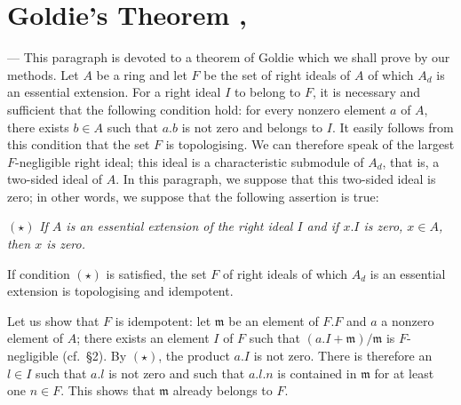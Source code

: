 %
%
%

\section{Goldie's Theorem \textup{\cite{goldie}, \cite{lesieur-croisot-1}}}

--- This paragraph is devoted to a theorem of Goldie which we shall
prove by our methods. Let $A$ be a ring and let $F$ be the set of right
ideals of $A$ of which $A_d$ is an essential extension. For a right
ideal $I$ to belong to $F$, it is necessary and sufficient that the
following condition hold: for every nonzero element $a$ of $A$, there
exists $b\in A$ such that $a.b$ is not zero and belongs to $I$. It
easily follows from this condition that the set $F$ is topologising. We
can therefore speak of the largest $F$-negligible right ideal; this
ideal is a characteristic submodule of $A_d$, that is, a two-sided ideal
of $A$. In this paragraph, we suppose that this two-sided ideal is
zero; in other words, we suppose that the following assertion is true:

$(\star)$ \emph{If $A$ is an essential extension of the right ideal $I$
and if $x.I$ is zero, $x\in A$, then $x$ is zero.}

\begin{lemma}
If condition $(\star)$ is satisfied, the set $F$ of right ideals of
which $A_d$ is an essential extension is topologising and idempotent.
\end{lemma}

Let us show that $F$ is idempotent: let $\mathfrak{m}$ be an element of
$F.F$ and $a$ a nonzero element of $A$; there exists an element $I$ of
$F$ such that $(a.I+\mathfrak{m})/\mathfrak{m}$ is $F$-negligible
(cf.\ \S2). By $(\star)$, the product $a.I$ is not zero. There is
therefore an $l\in I$ such that $a.l$ is not zero and such that $a.l.n$
is contained in $\mathfrak{m}$ for at least one $n\in F$. This shows
that $\mathfrak{m}$ already belongs to $F$.

